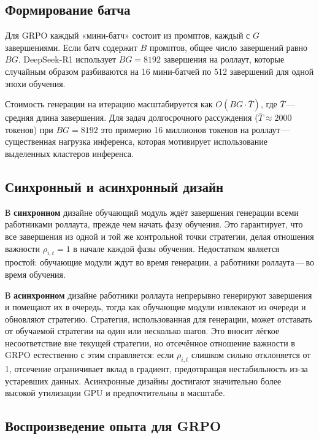 \subsection{Формирование батча}

Для GRPO каждый «мини-батч» состоит из промптов, каждый с $G$ завершениями. Если батч содержит $B$ промптов, общее число завершений равно $BG$. DeepSeek-R1 использует $BG = 8192$ завершения на роллаут, которые случайным образом разбиваются на 16 мини-батчей по 512 завершений для одной эпохи обучения.

Стоимость генерации на итерацию масштабируется как $O(BG \cdot \bar{T})$, где $\bar{T}$\,---\,средняя длина завершения. Для задач долгосрочного рассуждения ($\bar{T} \approx 2000$ токенов) при $BG = 8192$ это примерно 16 миллионов токенов на роллаут\,---\,существенная нагрузка инференса, которая мотивирует использование выделенных кластеров инференса.

\subsection{Синхронный и асинхронный дизайн}

В \textbf{синхронном} дизайне обучающий модуль ждёт завершения генерации всеми работниками роллаута, прежде чем начать фазу обучения. Это гарантирует, что все завершения из одной и той же контрольной точки стратегии, делая отношения важности $\rho_{i,t} = 1$ в начале каждой фазы обучения. Недостатком является простой: обучающие модули ждут во время генерации, а работники роллаута\,---\,во время обучения.

В \textbf{асинхронном} дизайне работники роллаута непрерывно генерируют завершения и помещают их в очередь, тогда как обучающие модули извлекают из очереди и обновляют стратегию. Стратегия, использованная для генерации, может отставать от обучаемой стратегии на один или несколько шагов. Это вносит лёгкое несоответствие вне текущей стратегии, но отсечённое отношение важности в GRPO естественно с этим справляется: если $\rho_{i,t}$ слишком сильно отклоняется от 1, отсечение ограничивает вклад в градиент, предотвращая нестабильность из-за устаревших данных. Асинхронные дизайны достигают значительно более высокой утилизации GPU и предпочтительны в масштабе.

\subsection{Воспроизведение опыта для GRPO}

